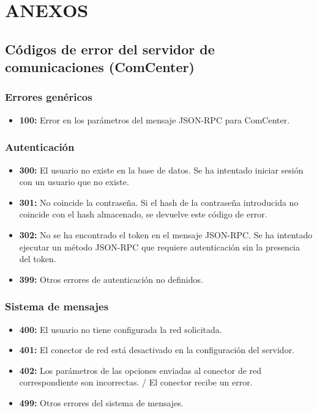 \documentclass[spanish,12pt, a4paper, twoside]{paper}
\let\oldsection\section
\def\section{\cleardoublepage\oldsection}
\begin{document}
\section*{ANEXOS}

\subsection*{Códigos de error del servidor de comunicaciones (ComCenter)}

\subsubsection*{Errores genéricos}

\begin{itemize}
\item\textbf{100:} Error en los parámetros del mensaje JSON-RPC para ComCenter.
\end{itemize}

\subsubsection*{Autenticación}

\begin{itemize}
\item\textbf{300:} El usuario no existe en la base de datos. Se ha intentado iniciar sesión con un usuario que no existe.
\item\textbf{301:} No coincide la contraseña. Si el hash de la contraseña introducida no coincide con el hash almacenado, se devuelve este código de error.
\item\textbf{302:} No se ha encontrado el token en el mensaje JSON-RPC. Se ha intentado ejecutar un método JSON-RPC que requiere autenticación sin la presencia del token.
\item\textbf{399:} Otros errores de autenticación no definidos.
\end{itemize}

\subsubsection*{Sistema de mensajes}

\begin{itemize}
\item\textbf{400:} El usuario no tiene configurada la red solicitada.
\item\textbf{401:} El conector de red está desactivado en la configuración del servidor.
\item\textbf{402:} Los parámetros de las opciones enviadas al conector de red correspondiente son incorrectas. / El conector recibe un error.
\item\textbf{499:} Otros errores del sistema de mensajes.
\end{itemize}
\end{document}
